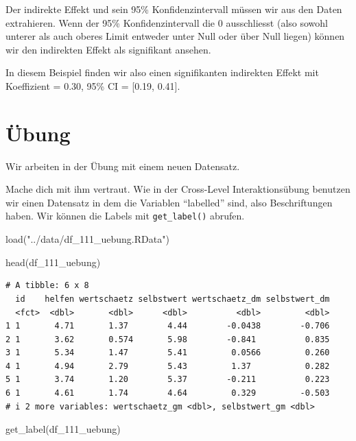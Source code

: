 \documentclass[
  letterpaper,
  DIV=11,
  numbers=noendperiod]{scrreprt}
\newenvironment{Shaded}{\begin{snugshade}}{\end{snugshade}}
\newcommand{\FunctionTok}[1]{\textcolor[rgb]{0.28,0.35,0.67}{#1}}
\newcommand{\NormalTok}[1]{\textcolor[rgb]{0.00,0.23,0.31}{#1}}
\newcommand{\StringTok}[1]{\textcolor[rgb]{0.13,0.47,0.30}{#1}}
\begin{document}
Der indirekte Effekt und sein 95\% Konfidenzintervall müssen wir aus den
Daten extrahieren. Wenn der 95\% Konfidenzintervall die 0 ausschliesst
(also sowohl unterer als auch oberes Limit entweder unter Null oder über
Null liegen) können wir den indirekten Effekt als signifikant ansehen.

In diesem Beispiel finden wir also einen signifikanten indirekten Effekt
mit Koeffizient = 0.30, 95\% CI = {[}0.19, 0.41{]}.

\section{Übung}\label{uxfcbung-3}

Wir arbeiten in der Übung mit einem neuen Datensatz.

Mache dich mit ihm vertraut. Wie in der Cross-Level Interaktionsübung
benutzen wir einen Datensatz in dem die Variablen ``labelled'' sind,
also Beschriftungen haben. Wir können die Labels mit
\texttt{get\_label()} abrufen.

\begin{Shaded}
\begin{Highlighting}[]
\FunctionTok{load}\NormalTok{(}\StringTok{"../data/df\_111\_uebung.RData"}\NormalTok{)}

\FunctionTok{head}\NormalTok{(df\_111\_uebung)}
\end{Highlighting}
\end{Shaded}

\begin{verbatim}
# A tibble: 6 x 8
  id    helfen wertschaetz selbstwert wertschaetz_dm selbstwert_dm
  <fct>  <dbl>       <dbl>      <dbl>          <dbl>         <dbl>
1 1       4.71       1.37        4.44        -0.0438        -0.706
2 1       3.62       0.574       5.98        -0.841          0.835
3 1       5.34       1.47        5.41         0.0566         0.260
4 1       4.94       2.79        5.43         1.37           0.282
5 1       3.74       1.20        5.37        -0.211          0.223
6 1       4.61       1.74        4.64         0.329         -0.503
# i 2 more variables: wertschaetz_gm <dbl>, selbstwert_gm <dbl>
\end{verbatim}

\begin{Shaded}
\begin{Highlighting}[]
\FunctionTok{get\_label}\NormalTok{(df\_111\_uebung)}
\end{Highlighting}
\end{Shaded}
\end{document}
